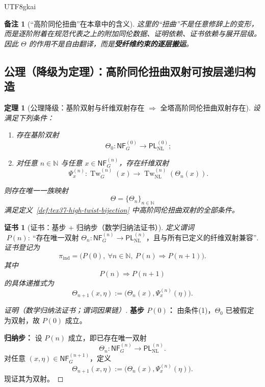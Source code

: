 \documentclass[12pt]{article}
\newtheorem{theorem}{定理}[section]
\newtheorem{remark}{备注}[section]
\newtheorem{Certificate}{证书}[section]
\newcommand{\NN}{\mathbb{N}}
\newcommand{\Tw}{\operatorname{Tw}}
\begin{document}
\begin{CJK*}{UTF8}{gkai}
\begin{remark}[“高阶同伦扭曲”在本章中的含义]
这里的“扭曲”不是任意修辞上的变形，而是逐阶附着在规范代表之上的附加同伦数据、证明依赖、证书依赖与展开层级。
因此 $\Theta$ 的作用不是自由翻译，而是\textbf{受纤维约束的逐层搬运}。
\end{remark}

\subsection{公理（降级为定理）：高阶同伦扭曲双射可按层递归构造}
\label{subsec:tex37-axiom-downgrade}

\begin{theorem}[公理降级：基阶双射与纤维双射存在 $\Rightarrow$ 全塔高阶同伦扭曲双射存在]
\label{thm:tex37-axiom-downgrade}
设满足下列条件：
\begin{enumerate}
  \item 存在基阶双射
  \[
    \Theta_0:\mathsf{NF}_G^{(0)}\to \mathsf{PL}_{\mathrm{NL}}^{(0)};
  \]
  \item 对任意 $n\in\NN$ 与任意 $x\in\mathsf{NF}_G^{(n)}$，存在纤维双射
  \[
    \Psi_x^{(n)}:\Tw_G^{(n)}(x)\to \Tw_{\mathrm{NL}}^{(n)}(\Theta_n(x)).
  \]
\end{enumerate}
则存在唯一一族映射
\[
  \Theta=\{\Theta_n\}_{n\in\NN}
\]
满足定义~\ref{def:tex37-high-twist-bijection} 中高阶同伦扭曲双射的全部条件。
\end{theorem}

\begin{Certificate}[证书：基步 + 归纳步（数学归纳法证书）]
\label{cert:tex37-axiom-downgrade}
定义谓词
\[
  P(n):\ \text{“存在唯一双射 }\Theta_n:\mathsf{NF}_G^{(n)}\to \mathsf{PL}_{\mathrm{NL}}^{(n)}
  \text{，且与所有已定义的纤维双射兼容”}.
\]
证书登记为
\[
  \pi_{\mathrm{ind}}
  =
  \bigl(P(0),\ \forall n\in\NN,\ P(n)\Rightarrow P(n+1)\bigr).
\]
其中
\[
  P(n)\Rightarrow P(n+1)
\]
的具体递推式为
\[
  \Theta_{n+1}(x,\eta)
  :=
  \bigl(\Theta_n(x),\Psi_x^{(n)}(\eta)\bigr).
\]
\end{Certificate}

\begin{proof}[证明（数学归纳法证书；谓词因果链）]
\textbf{基步 $P(0)$：}
由条件(1)，$\Theta_0$ 已被假定为双射，故 $P(0)$ 成立。

\textbf{归纳步：}
设 $P(n)$ 成立，即已存在唯一双射
\[
  \Theta_n:\mathsf{NF}_G^{(n)}\to \mathsf{PL}_{\mathrm{NL}}^{(n)}.
\]
对任意 $(x,\eta)\in\mathsf{NF}_G^{(n+1)}$，定义
\[
  \Theta_{n+1}(x,\eta):=\bigl(\Theta_n(x),\Psi_x^{(n)}(\eta)\bigr).
\]
现证其为双射。


\end{proof}
\end{CJK*}
\end{document}
